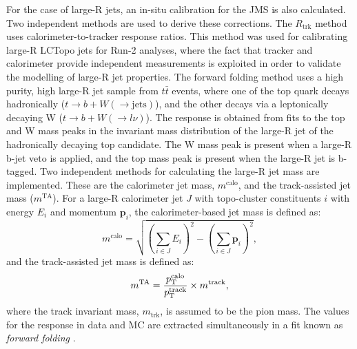 For the case of large-R jets, an in-situ calibration for the JMS is also calculated. Two independent methods are used to derive these corrections. The $R_{\text{trk}}$ method uses calorimeter-to-tracker response ratios. This method was used for calibrating large-R LCTopo jets for Run-2 analyses, where the fact that tracker and calorimeter provide independent measurements is exploited in order to validate the modelling of large-R jet properties. The forward folding method uses a high purity, high \pt large-R jet sample from $t\bar{t}$ events, where one of the top quark decays hadronically ($t\rightarrow b+W(\rightarrow\text{jets})$), and the other decays via a leptonically decaying W ($t\rightarrow b+W(\rightarrow l\nu)$). The response is obtained from fits to the top and W mass peaks in the invariant mass distribution of the large-R jet of the hadronically decaying top candidate. The W mass peak is present when a large-R b-jet veto is applied, and the top mass peak is present when the large-R jet is b-tagged. Two independent methods for calculating the large-R jet mass are implemented. These are the calorimeter jet mass, $m^{\text{calo}}$, and the track-assisted jet mass ($m^{\text{TA}}$). For a large-R calorimeter jet $J$ with topo-cluster constituents $i$ with energy $E_i$ and momentum $\mathbf{p}_i$, the calorimeter-based jet mass is defined as:
\begin{equation}
    m^{\text{calo}}=\sqrt{(\sum_{i\in J}E_i)^2-(\sum_{i\in J}\mathbf{p}_i)^2},
\end{equation}
and the track-assisted jet mass is defined as:
\begin{equation}
    m^{\text{TA}}=\frac{p_{\text{T}}^\text{calo}}{p_{\text{T}}^\text{track}}\times m^{\text{track}},
\end{equation}
where the track invariant mass, $m_{\text{trk}}$, is assumed to be the pion mass. The values for the response in data and MC are extracted simultaneously in a fit known as \textit{forward folding} \cite{Atlas:largercali}.

